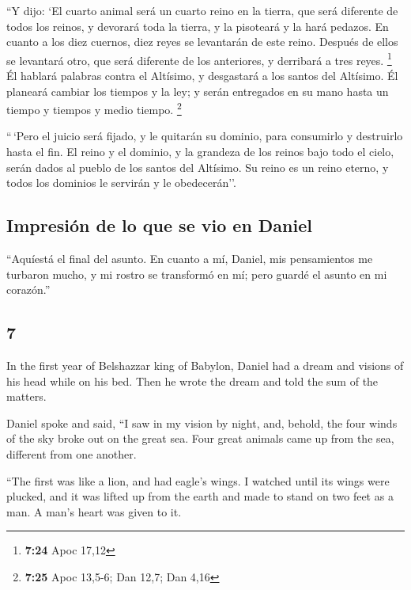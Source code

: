 \begin{paracol}{2}
 ``Y dijo: `El cuarto animal será un cuarto reino en la
tierra, que será diferente de todos los reinos, y devorará toda la
tierra, y la pisoteará y la hará pedazos.  En cuanto a
los diez cuernos, diez reyes se levantarán de este reino. Después de
ellos se levantará otro, que será diferente de los anteriores, y
derribará a tres reyes. \footnote{\textbf{7:24} Apoc 17,12}
 Él hablará palabras contra el Altísimo, y desgastará a
los santos del Altísimo. Él planeará cambiar los tiempos y la ley; y
serán entregados en su mano hasta un tiempo y tiempos y medio tiempo.
\footnote{\textbf{7:25} Apoc 13,5-6; Dan 12,7; Dan 4,16}

 ``\,`Pero el juicio será fijado, y le quitarán su
dominio, para consumirlo y destruirlo hasta el fin.  El
reino y el dominio, y la grandeza de los reinos bajo todo el cielo,
serán dados al pueblo de los santos del Altísimo. Su reino es un reino
eterno, y todos los dominios le servirán y le obedecerán''.

\hypertarget{impresiuxf3n-de-lo-que-se-vio-en-daniel}{%
\subsection{Impresión de lo que se vio en
Daniel}\label{impresiuxf3n-de-lo-que-se-vio-en-daniel}}

 ``Aquíestá el final del asunto. En cuanto a mí, Daniel,
mis pensamientos me turbaron mucho, y mi rostro se transformó en mí;
pero guardé el asunto en mi corazón.''

\switchcolumn
\begin{otherlanguage}{english}

\hypertarget{section-13}{%
\section{7}\label{section-13}}

 In the first year of Belshazzar king of Babylon, Daniel
had a dream and visions of his head while on his bed. Then he wrote the
dream and told the sum of the matters.

 Daniel spoke and said, ``I saw in my vision by night,
and, behold, the four winds of the sky broke out on the great sea.
 Four great animals came up from the sea, different from
one another.

 ``The first was like a lion, and had eagle's wings. I
watched until its wings were plucked, and it was lifted up from the
earth and made to stand on two feet as a man. A man's heart was given to
it.


\end{otherlanguage}
\end{paracol}
